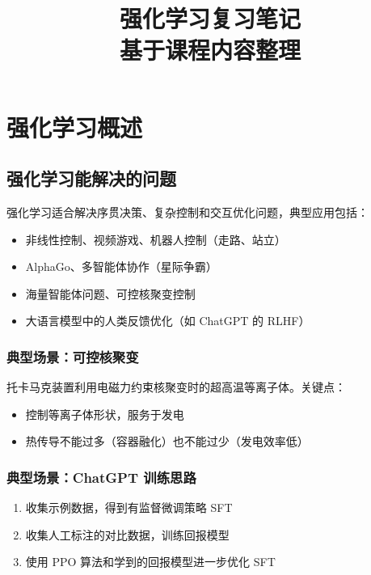 \documentclass[12pt,a4paper]{article}
\title{\textbf{强化学习复习笔记}\\[0.5em]\large 基于课程内容整理}
\author{}
\date{}
\newcommand{\1}{\mathbf{1}}
\begin{document}
\maketitle
\tableofcontents
\newpage

\section{强化学习概述}

\subsection{强化学习能解决的问题}

强化学习适合解决序贯决策、复杂控制和交互优化问题，典型应用包括：

\begin{itemize}[leftmargin=2em]
  \item 非线性控制、视频游戏、机器人控制（走路、站立）
  \item AlphaGo、多智能体协作（星际争霸）
  \item 海量智能体问题、可控核聚变控制
  \item 大语言模型中的人类反馈优化（如 ChatGPT 的 RLHF）
\end{itemize}

\subsubsection*{典型场景：可控核聚变}

托卡马克装置利用电磁力约束核聚变时的超高温等离子体。关键点：

\begin{itemize}[leftmargin=2em]
  \item 控制等离子体形状，服务于发电
  \item 热传导不能过多（容器融化）也不能过少（发电效率低）
\end{itemize}

\subsubsection*{典型场景：ChatGPT 训练思路}

\begin{enumerate}[leftmargin=2em]
  \item 收集示例数据，得到有监督微调策略 SFT
  \item 收集人工标注的对比数据，训练回报模型
  \item 使用 PPO 算法和学到的回报模型进一步优化 SFT
\end{enumerate}
\end{document}
